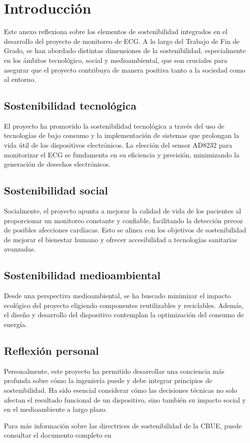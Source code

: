 
\section{Introducción}
Este anexo reflexiona sobre los elementos de sostenibilidad integrados en el desarrollo del proyecto de monitoreo de ECG. A lo largo del Trabajo de Fin de Grado, se han abordado distintas dimensiones de la sostenibilidad, especialmente en los ámbitos tecnológico, social y medioambiental, que son cruciales para asegurar que el proyecto contribuya de manera positiva tanto a la sociedad como al entorno.

\subsection{Sostenibilidad tecnológica}
El proyecto ha promovido la sostenibilidad tecnológica a través del uso de tecnologías de bajo consumo y la implementación de sistemas que prolongan la vida útil de los dispositivos electrónicos. La elección del sensor AD8232 para monitorizar el ECG se fundamenta en su eficiencia y precisión, minimizando la generación de desechos electrónicos.

\subsection{Sostenibilidad social}
Socialmente, el proyecto apunta a mejorar la calidad de vida de los pacientes al proporcionar un monitoreo constante y confiable, facilitando la detección precoz de posibles afecciones cardíacas. Esto se alinea con los objetivos de sostenibilidad de mejorar el bienestar humano y ofrecer accesibilidad a tecnologías sanitarias avanzadas.

\subsection{Sostenibilidad medioambiental}
Desde una perspectiva medioambiental, se ha buscado minimizar el impacto ecológico del proyecto eligiendo componentes reutilizables y reciclables. Además, el diseño y desarrollo del dispositivo contemplan la optimización del consumo de energía.

\subsection{Reflexión personal}
Personalmente, este proyecto ha permitido desarrollar una conciencia más profunda sobre cómo la ingeniería puede y debe integrar principios de sostenibilidad. Ha sido esencial considerar cómo las decisiones técnicas no solo afectan el resultado funcional de un dispositivo, sino también su impacto social y en el medioambiente a largo plazo.

Para más información sobre las directrices de sostenibilidad de la CRUE, puede consultar el documento completo en \cite{crue-sostenibilidad}